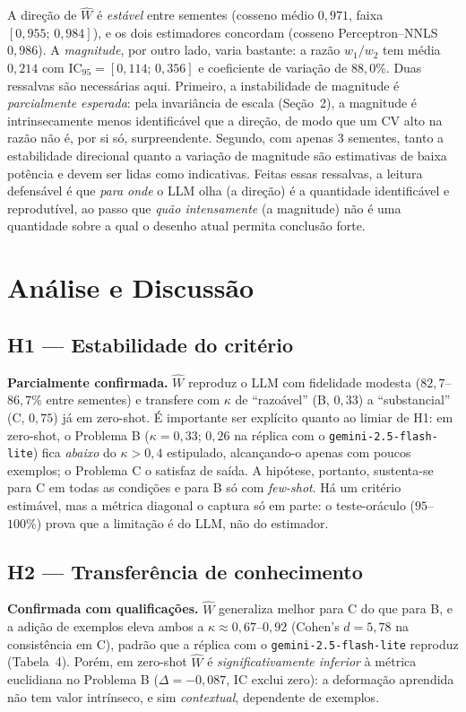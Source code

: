 \documentclass[12pt,a4paper]{article}
\newcommand{\West}{\ensuremath{\hat{W}}}   %
\begin{document}
A direção de \West{} é \emph{estável} entre sementes (cosseno médio $0{,}971$, faixa
$[0{,}955;\,0{,}984]$), e os dois estimadores concordam (cosseno Perceptron--NNLS
$0{,}986$). A \emph{magnitude}, por outro lado, varia bastante: a razão $w_1/w_2$ tem média
$0{,}214$ com IC$_{95}=[0{,}114;\,0{,}356]$ e coeficiente de variação de $88{,}0\%$. Duas
ressalvas são necessárias aqui. Primeiro, a instabilidade de magnitude é \emph{parcialmente
esperada}: pela invariância de escala (Seção~2), a magnitude é
intrinsecamente menos identificável que a direção, de modo que um CV alto na razão não é, por
si só, surpreendente. Segundo, com apenas $3$ sementes, tanto a estabilidade direcional
quanto a variação de magnitude são estimativas de baixa potência e devem ser lidas como
indicativas. Feitas essas ressalvas, a leitura defensável é que \emph{para onde} o LLM olha
(a direção) é a quantidade identificável e reprodutível, ao passo que \emph{quão
intensamente} (a magnitude) não é uma quantidade sobre a qual o desenho atual permita
conclusão forte.

\section{Análise e Discussão}
\label{sec:discussao}

\subsection{H1 — Estabilidade do critério}
\textbf{Parcialmente confirmada.} \West{} reproduz o LLM com fidelidade modesta
($82{,}7$–$86{,}7\%$ entre sementes) e transfere com $\kappa$ de ``razoável'' (B, $0{,}33$) a
``substancial'' (C, $0{,}75$) já em zero-shot. É importante ser explícito quanto ao limiar de
H1: em zero-shot, o Problema B ($\kappa = 0{,}33$; $0{,}26$ na réplica com o
\texttt{gemini-2.5-flash-lite}) fica \emph{abaixo} do $\kappa > 0{,}4$
estipulado, alcançando-o apenas com poucos exemplos; o Problema C o satisfaz de saída. A
hipótese, portanto, sustenta-se para C em todas as condições e para B só com \emph{few-shot}.
Há um critério estimável, mas a métrica diagonal o captura só em parte: o teste-oráculo
($95$–$100\%$) prova que a limitação é do LLM, não do estimador.

\subsection{H2 — Transferência de conhecimento}
\textbf{Confirmada com qualificações.} \West{} generaliza melhor para C do que para B, e a
adição de exemplos eleva ambos a $\kappa \approx 0{,}67$–$0{,}92$ (Cohen's $d = 5{,}78$ na
consistência em C), padrão que a réplica com o \texttt{gemini-2.5-flash-lite} reproduz
(Tabela~4). Porém, em zero-shot \West{} é \emph{significativamente inferior} à
métrica euclidiana no Problema B ($\Delta = -0{,}087$, IC exclui zero): a deformação
aprendida não tem valor intrínseco, e sim \emph{contextual}, dependente de exemplos.
\end{document}
